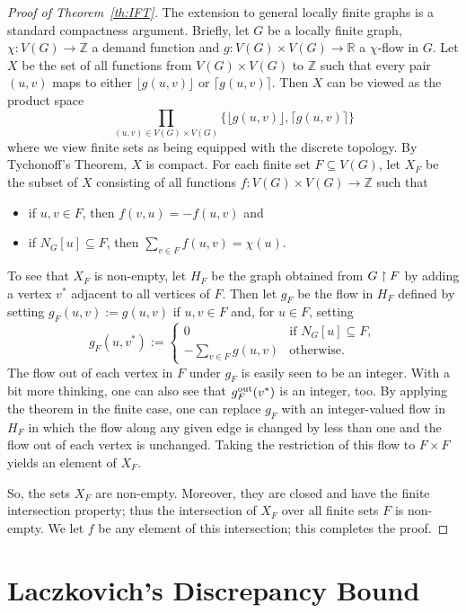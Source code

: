 \documentclass[12pt,a4paper]{amsart}
\numberwithin{equation}{section}
\theoremstyle{definition}
\begin{document}
\begin{proof}[Proof of Theorem~\ref{th:IFT}]
The extension to general locally finite graphs is a standard compactness argument. Briefly, let $G$ be a locally finite graph, $\chi:V(G)\to \mathbb{Z}$ a demand function and $g:V(G)\times V(G)\to\mathbb{R}$ a $\chi$-flow in $G$. Let $X$ be the set of all functions from $V(G)\times V(G)$ to $\mathbb{Z}$ such that every pair $(u,v)$ maps to either  $\lfloor g(u,v)\rfloor$ or $\lceil g(u,v)\rceil$. Then $X$ can be viewed as the product space 
\[\prod_{(u,v)\in V(G)\times V(G)}\{\lfloor g(u,v)\rfloor, \lceil g(u,v)\rceil\}\]
where we view finite sets as being equipped with the discrete topology. By Tychonoff's Theorem, $X$ is compact. For each finite set $F\subseteq V(G)$, let $X_F$ be the subset of $X$ consisting of all functions $f:V(G)\times V(G)\to \mathbb{Z}$ such that 
\begin{itemize}
\item if $u,v\in F$, then $f(v,u)=-f(u,v)$ and 
\item if $N_G[u]\subseteq F$, then $\sum_{v\in F} f(u,v)=\chi(u)$. 
\end{itemize}
To see that $X_F$ is non-empty, let $H_F$ be the graph obtained from $G\upharpoonright F$ by adding a vertex $v^*$ adjacent to all vertices of $F$. Then let $g_F$ be the flow in $H_F$ defined by setting $g_F(u,v):=g(u,v)$ if $u,v\in F$ and, for $u\in F$, setting
\[g_F(u,v^*):=\begin{cases}0&\text{if }N_G[u]\subseteq F,\\
-\sum_{v\in F}g(u,v)&\text{otherwise}.\end{cases}\]
The flow out of each vertex in $F$ under $g_F$ is easily seen to be an integer. With a bit more thinking, one can also see that $g_F^{\operatorname{out}}(v^*)$ is an integer, too. By applying the theorem in the finite case, one can replace $g_F$ with an integer-valued flow in $H_F$ in which the flow along any given edge is changed by less than one and the flow out of each vertex is unchanged. Taking the restriction of this flow to $F\times F$ yields an element of $X_F$.

So, the sets $X_F$ are non-empty. Moreover, they are closed and have the finite intersection property; thus the intersection of $X_F$ over all finite sets $F$ is non-empty. We let $f$ be any element of this intersection; this completes the proof.
\end{proof}

\section{Laczkovich's Discrepancy Bound}
\label{app:discrep}
\end{document}
